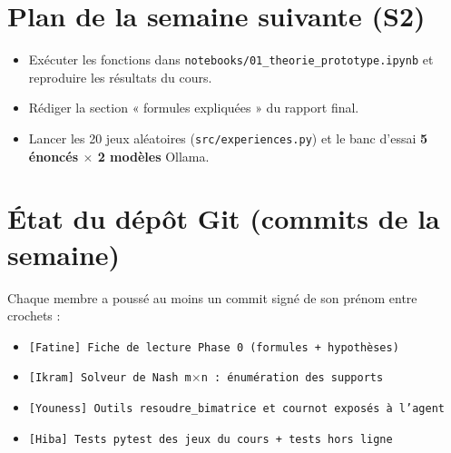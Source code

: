 \documentclass[11pt,a4paper]{article}
\begin{document}
\section{Plan de la semaine suivante (S2)}

\begin{itemize}
  \item Exécuter les fonctions dans \texttt{notebooks/01\_theorie\_prototype.ipynb} et
  reproduire les résultats du cours.
  \item Rédiger la section « formules expliquées » du rapport final.
  \item Lancer les 20 jeux aléatoires (\texttt{src/experiences.py}) et le banc d'essai
  \textbf{5 énoncés $\times$ 2 modèles} Ollama.
\end{itemize}

\section{État du dépôt Git (commits de la semaine)}

Chaque membre a poussé au moins un commit signé de son prénom entre crochets :
\begin{itemize}
  \item \texttt{[Fatine] Fiche de lecture Phase 0 (formules + hypothèses)}
  \item \texttt{[Ikram] Solveur de Nash m$\times$n : énumération des supports}
  \item \texttt{[Youness] Outils resoudre\_bimatrice et cournot exposés à l'agent}
  \item \texttt{[Hiba] Tests pytest des jeux du cours + tests hors ligne}
\end{itemize}
\end{document}
